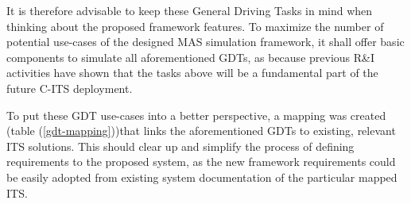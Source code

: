 \documentclass[main.tex]{subfiles}
\begin{document}
It is therefore advisable to keep these General Driving Tasks in mind when thinking about the proposed framework 
features. To maximize the number of potential use-cases of the designed MAS simulation framework, 
it shall offer basic components to simulate all aforementioned GDTs, as because previous R\&I
activities have shown that the tasks above will be a fundamental part of the future C-ITS deployment.

To put these GDT use-cases into a better perspective, a mapping was created (table
(\ref{gdt-mapping}))that links the aforementioned GDTs to existing, relevant ITS solutions.
This should clear up and simplify the process of defining requirements to the proposed system,
as the new framework requirements could be easily adopted from existing system documentation of
the particular mapped ITS.
\end{document}
